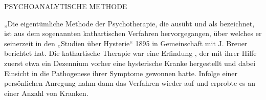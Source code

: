 \documentclass[twoside=true,titlepage=false,open=any, parskip=never, fontsize=10pt, headings=small, chapterprefix=false, appendixprefix=false]{scrbook}
\begin{document}
            
            
            
        
               
                   PSYCHOANALYTISCHE METHODE 
            
        \pend
        \beforeeledchapter
    
            
        \pstart
        „Die eigentümliche Methode der Psychotherapie, die  ausübt und als  bezeichnet, ist aus dem sogenannten
               kathartischen Verfahren hervorgegangen,
               über welches er seinerzeit in den „Studien über Hysterie“ 1895 in
               Gemeinschaft mit
               J. Breuer berichtet
               hat. Die kathartische Therapie war
               eine Erfindung , der mit ihrer Hilfe zuerst etwa ein Dezennium vorher
               eine hysterische Kranke hergestellt und dabei Einsicht in die Pathogenese ihrer Symptome gewonnen
               hatte. Infolge einer persönlichen Anregung  nahm dann  das Verfahren
               wieder auf und erprobte es an einer  Anzahl von Kranken.
        \pend
    
\end{document}
